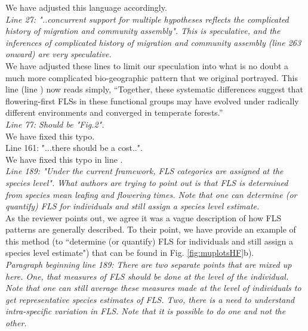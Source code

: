 \documentclass{article}[11pt]
\begin{document}
\noident We have adjusted this language accordingly.\\

\emph{Line 27: "..concurrent support for multiple hypotheses reflects the complicated history of migration and community assembly". This is speculative, and the inferences of complicated history of migration and community assembly (line 263 onward) are very speculative.}\\

\noindent We have adjusted these lines to limit our speculation into what is no doubt a much more complicated bio-geographic pattern that we original portrayed. This line (line ) now reads simply, ``Together, these systematic differences suggest that flowering-first FLSs in these functional groups may have evolved under radically different environments and converged in temperate forests.'' \\

\emph{Line 77: Should be "Fig.2".}\\

\noindent We have fixed this typo.\\

Line 161: "...there should be a cost..".\\

\noindent We have fixed this typo in line .\\

\emph{Line 189: "Under the current framework, FLS categories are assigned at the species level". What authors are trying to point out is that FLS is determined from species mean leafing and flowering times. Note that one can determine (or quantify) FLS for individuals and still assign a species level estimate.}\\

\noindent As the reviewer points out, we agree it was a vague description of how FLS patterns are generally described. To their point, we have provide an example of this method (to ``determine (or quantify) FLS for individuals and still assign a species level estimate") that can be found in Fig. \ref{fig:muplotsHF}b).\\


\emph{Paragraph beginning line 189: There are two separate points that are mixed up here. One, that measures of FLS should be done at the level of the individual. Note that one can still average these measures made at the level of individuals to get representative species estimates of FLS. Two, there is a need to understand intra-specific variation in FLS. Note that it is possible to do one and not the other.}
 
\end{document}
